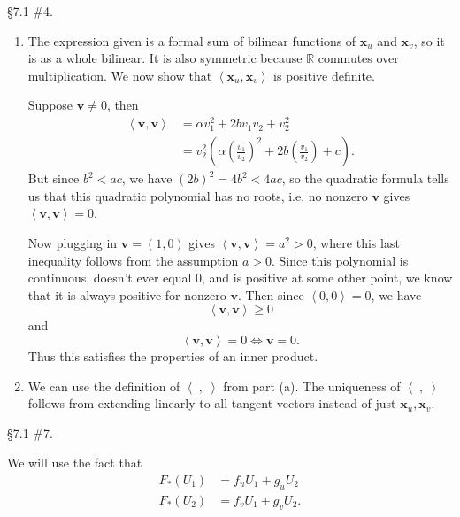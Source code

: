 \documentclass[10pt]{report}
\begin{document}
\begin{exer}[]
\S 7.1 \#4.
\end{exer}
\begin{enumerate}
	\item The expression given is a formal sum of bilinear functions of $\mathbf{x}_{u}$ and $\mathbf{x}_{v}$, so it is as a whole bilinear. It is also symmetric because $\mathbb{R}$ commutes over multiplication. We now show that $\left\langle \mathbf{x}_{u},\mathbf{x}_{v} \right\rangle$ is positive definite.

		Suppose $ \mathbf{v}\neq 0$, then
		\begin{align*}
			\left\langle \mathbf{v},\mathbf{v} \right\rangle &= \alpha v_1^2+2bv_1v_2+v_2^2 \\
									 &= v_2^2\left( \alpha\left( \frac{v_1}{v_2}  \right)^2+2b\left( \frac{v_1}{v_2}  \right) +c\right).
		\end{align*}
		But since $b^2<ac$, we have $(2b)^2=4b^2 <4ac$, so the quadratic formula tells us that this quadratic polynomial has no roots, i.e. no nonzero $\mathbf{v}$ gives $\left\langle \mathbf{v},\mathbf{v} \right\rangle=0$.

		Now plugging in $\mathbf{v}=(1,0)$ gives $\left\langle \mathbf{v},\mathbf{v} \right\rangle=a^2>0$, where this last inequality follows from the assumption $a>0$. Since this polynomial is continuous, doesn't ever equal 0, and is positive at some other point, we know that it is always positive for nonzero $\mathbf{v}$. Then since $\left\langle 0,0 \right\rangle=0$, we have
		\[
		\left\langle \mathbf{v},\mathbf{v} \right\rangle\geq 0
		\] 
		and
		\[
		\left\langle \mathbf{v},\mathbf{v} \right\rangle=0 \iff \mathbf{v}=0.
		\] Thus this satisfies the properties of an inner product.

	\item We can use the definition of $\left\langle \;,\; \right\rangle$ from part (a). The uniqueness of $\left\langle \;,\; \right\rangle$ follows from extending linearly to all tangent vectors instead of just $\mathbf{x}_{u}, \mathbf{x}_{v}$.
\end{enumerate}
\pagebreak

\begin{exer}[]
\S 7.1 \#7.
\end{exer}
We will use the fact that
\begin{align*}
	F_{*}(U_1) &= f_{u}U_1+g_{u}U_2 \\
	F_{*}(U_2) &= f_{v}U_1 + g_{v}U_2.
\end{align*}
\end{document}
